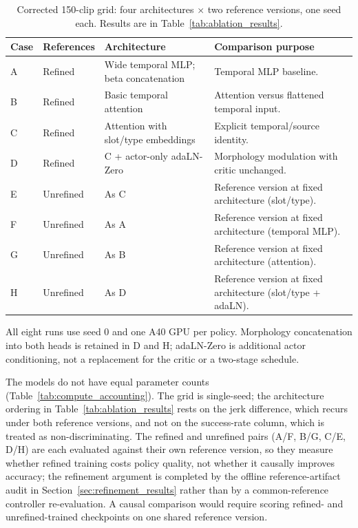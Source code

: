 \begin{table}[t]
\centering
\small
\caption{Corrected 150-clip grid: four architectures $\times$ two reference
versions, one seed each. Results are in Table~\ref{tab:ablation_results}.}\label{tab:ablations}
\begin{tabularx}{\linewidth}{@{}llYY@{}}
\toprule
Case & References & Architecture & Comparison purpose \\
\midrule
A & Refined & Wide temporal MLP; beta concatenation &
Temporal MLP baseline. \\
B & Refined & Basic temporal attention &
Attention versus flattened temporal input. \\
C & Refined & Attention with slot/type embeddings &
Explicit temporal/source identity. \\
D & Refined & C + actor-only adaLN-Zero &
Morphology modulation with critic unchanged. \\
E & Unrefined & As C &
Reference version at fixed architecture (slot/type). \\
F & Unrefined & As A &
Reference version at fixed architecture (temporal MLP). \\
G & Unrefined & As B &
Reference version at fixed architecture (attention). \\
H & Unrefined & As D &
Reference version at fixed architecture (slot/type + adaLN). \\
\bottomrule
\end{tabularx}
\end{table}

All eight runs use seed 0 and one A40 GPU per policy. Morphology
concatenation into both heads is retained in D and H; adaLN-Zero is additional
actor conditioning, not a replacement for the critic or a two-stage schedule.

The models do not have equal parameter counts (Table~\ref{tab:compute_accounting}).
The grid is single-seed; the architecture ordering in
Table~\ref{tab:ablation_results} rests on the jerk difference, which recurs
under both reference versions, and not on the success-rate column, which is
treated as non-discriminating. The refined and unrefined pairs (A/F, B/G, C/E, D/H) are each
evaluated against their own reference version, so they measure whether refined
training costs policy quality, not whether it causally improves accuracy; the
refinement argument is completed by the offline reference-artifact audit in
Section~\ref{sec:refinement_results} rather than by a common-reference
controller re-evaluation. A causal comparison would require scoring
refined- and unrefined-trained checkpoints on one shared reference version.

